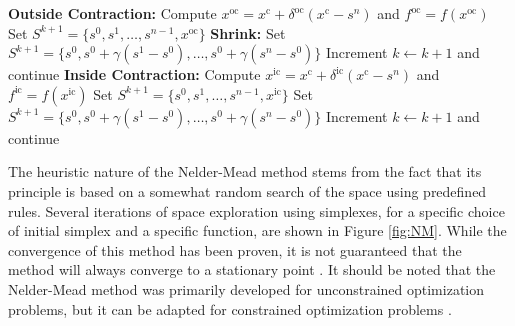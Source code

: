 \begin{algorithm}
\begin{algorithmic}[1]
		\State \textbf{Outside Contraction:} Compute $x^\text{oc} = x^\text{c} + \delta^{\text{oc}}(x^\text{c} - s^n)$ and $f^{\text{oc}} = f(x^{\text{oc}})$
		\State Set $S^{k+1} = \{s^0, s^1, \dots, s^{n-1}, x^{\text{oc}}\}$
		\Else
		\State \textbf{Shrink:} Set $S^{k+1} = \{s^0, s^0 + \gamma(s^1 - s^0), \dots, s^0 + \gamma(s^n - s^0)\}$
		\EndIf
		\State Increment $k \gets k+1$ and continue
		\Else
		\State \textbf{Inside Contraction:} Compute $x^{\text{ic}} = x^\text{c} + \delta^{\text{ic}}(x^\text{c} - s^n)$ and $f^{\text{ic}} = f(x^{\text{ic}})$
		\State Set $S^{k+1} = \{s^0, s^1, \dots, s^{n-1}, x^{\text{ic}}\}$
		\Else
		\State Set $S^{k+1} = \{s^0, s^0 + \gamma(s^1 - s^0), \dots, s^0 + \gamma(s^n - s^0)\}$
		\EndIf
		\State Increment $k \gets k+1$ and continue
		\EndIf
		\EndWhile
		\EndProcedure
	\end{algorithmic}
\end{algorithm}
%
The heuristic nature of the Nelder-Mead method stems from the fact that its principle is based on a somewhat random search of the space using predefined rules. Several iterations of space exploration using simplexes, for a specific choice of initial simplex and a specific function, are shown in Figure \ref{fig:NM}. While the convergence of this method has been proven, it is not guaranteed that the method will always converge to a stationary point \cite{BBO-textbook}. It should be noted that the Nelder-Mead method was primarily developed for unconstrained optimization problems, but it can be adapted for constrained optimization problems  \cite{BBO-textbook}.


